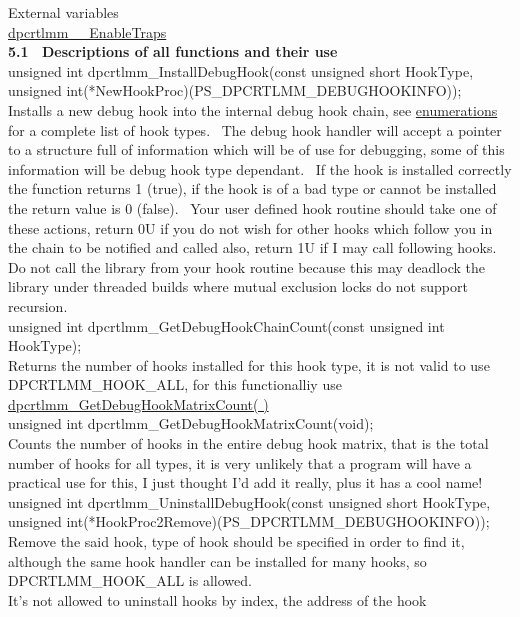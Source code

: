 \documentclass{article}
\begin{document}
\par External variables
\\
\href{#\_EnableTraps}{dpcrtlmm\_\_EnableTraps}
\\
\textbf{5.1~ Descriptions of all functions and their use}
\\
unsigned int dpcrtlmm\_InstallDebugHook(const
unsigned short HookType, unsigned
int(*NewHookProc)(PS\_DPCRTLMM\_DEBUGHOOKINFO));
\\
Installs a new debug hook into the internal debug
hook chain, see \href{#Enumerations}{enumerations} for a
complete list of hook types.~ The
debug hook handler will accept a pointer to a structure full of
information
which will be of use for debugging, some of this information will be
debug
hook type dependant.~ If the hook is installed correctly the
function
returns 1 (true), if the hook is of a bad type or cannot be installed
the
return value is 0 (false).~ Your user defined hook routine should
take one of these actions, return 0U if you do not wish for other hooks
which follow you in the chain to be notified and called also, return 1U
if I may call following hooks.
\\
Do not call the library from your hook routine because this may
deadlock the library under threaded builds where mutual exclusion locks
do not support recursion.
\\
unsigned int
dpcrtlmm\_GetDebugHookChainCount(const
unsigned int HookType);
\\
Returns the number of hooks installed for this
hook type, it is not valid to use DPCRTLMM\_HOOK\_ALL, for this
functionalliy
use \href{#GetDebugHookMatrixCount}{dpcrtlmm\_GetDebugHookMatrixCount(
)}
\\
unsigned int
dpcrtlmm\_GetDebugHookMatrixCount(void);
\\
Counts the number of hooks in the entire debug hook matrix, that is
the total number of hooks for all types, it is very unlikely that a
program
will have a practical use for this, I just thought I'd add it really,
plus
it has a cool name!
\\
unsigned int dpcrtlmm\_UninstallDebugHook(const
unsigned short HookType, unsigned
int(*HookProc2Remove)(PS\_DPCRTLMM\_DEBUGHOOKINFO));
\\
Remove the said hook, type of hook should be specified in order to
find it, although the same hook handler can be installed for many
hooks,
so DPCRTLMM\_HOOK\_ALL is allowed.
\\
It's not allowed to uninstall hooks by index, the address of the hook
\end{document}
